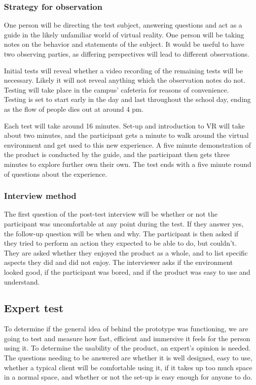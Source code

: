 
\subsubsection{Strategy for observation}

One person will be directing the test subject, answering questions and act as a guide in the likely unfamiliar world of virtual reality. One person will be taking notes on the behavior and statements of the subject. It would be useful to have two observing parties, as differing perspectives will lead to different observations. 

Initial tests will reveal whether a video recording of the remaining tests will be necessary. Likely it will not reveal anything which the observation notes do not. Testing will take place in the campus' cafeteria for reasons of convenience. Testing is set to start early in the day and last throughout the school day, ending as the flow of people dies out at around 4 pm.

Each test will take around 16 minutes. Set-up and introduction to VR will take about two minutes, and the participant gets a minute to walk around the virtual environment and get used to this new experience. A five minute demonstration of the product is conducted by the guide, and the participant then gets three minutes to explore further own their own. The test ends with a five minute round of questions about the experience. 



\subsubsection{Interview method}
The first question of the post-test interview will be whether or not the participant was uncomfortable at any point during the test. If they answer yes, the follow-up question will be when and why.
The participant is then asked if they tried to perform an action they expected to be able to do, but couldn't. They are asked whether they enjoyed the product as a whole, and to list specific aspects they did and did not enjoy. The interviewer asks if the environment looked good, if the participant was bored, and if the product was easy to use and understand. 
\iffalse
\subsection{Expert test}
To determine if the general idea of behind the prototype was functioning, we are going to test and measure how fast, efficient and immersive it feels for the person using it.
To determine the usability of the product, an expert's opinion is needed. The questions needing to be answered are whether it is well designed, easy to use, whether a typical client will be comfortable using it, if it takes up too much space in a normal space, and whether or not the set-up is easy enough for anyone to do.
